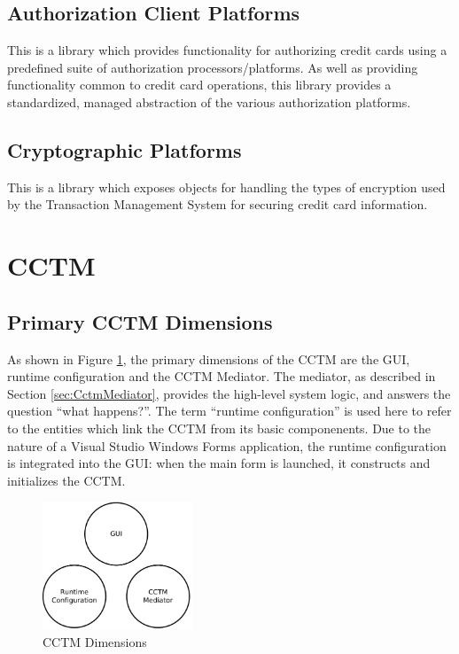 \documentclass[a4paper,oneside,10pt]{report}
\begin{document}
\subsection*{Authorization Client Platforms}
This is a library which provides functionality for authorizing credit cards using a predefined suite of authorization processors/platforms. As well as providing functionality common to credit card operations, this library provides a standardized, managed abstraction of the various authorization platforms.
\subsection*{Cryptographic Platforms}
This is a library which exposes objects for handling the types of encryption used by the Transaction Management System for securing credit card information.

\section{CCTM}
\subsection{Primary CCTM Dimensions}
As shown in Figure \ref{fig:CCTMDimensions}, the primary dimensions of the CCTM are the GUI, runtime configuration and the CCTM Mediator. The mediator, as described in Section \ref{sec:CctmMediator}, provides the high-level system logic, and answers the question ``what happens?''. The term ``runtime configuration'' is used here to refer to the entities which link the CCTM from its basic componenents. Due to the nature of a Visual Studio Windows Forms application, the runtime configuration is integrated into the GUI: when the main form is launched, it constructs and initializes the CCTM.

\begin{figure}
	\centering
		\includegraphics[width=0.4\textwidth]{CCTM_Dimensions.pdf}
	\caption{CCTM Dimensions}
	\label{fig:CCTMDimensions}
\end{figure}
\end{document}
